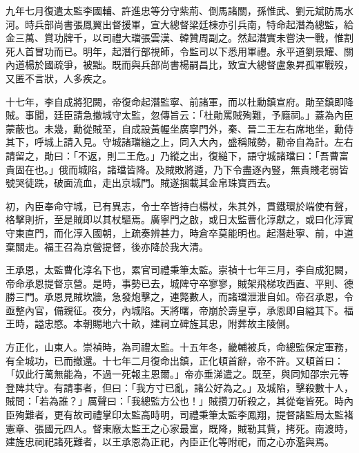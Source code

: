 \begin{pinyinscope}
九年七月復遣太監李國輔、許進忠等分守紫荊、倒馬諸關，孫惟武、劉元斌防馬水河。時兵部尚書張鳳翼出督援軍，宣大總督梁廷棟亦引兵南，特命起潛為總監，給金三萬、賞功牌千，以司禮大璫張雲漢、韓贊周副之。然起潛實未嘗決一戰，惟割死人首冒功而已。明年，起潛行部視師，令監司以下悉用軍禮。永平道劉景耀、關內道楊於國疏爭，被黜。既而與兵部尚書楊嗣昌比，致宣大總督盧象昇孤軍戰歿，又匿不言狀，人多疾之。

十七年，李自成將犯闕，帝復命起潛監寧、前諸軍，而以杜勳鎮宣府。勛至鎮即降賊。事聞，廷臣請急撤城守太監，忽傳旨云：「杜勛罵賊殉難，予廕祠。」蓋為內臣蒙蔽也。未幾，勳從賊至，自成設黃幄坐廣寧門外，秦、晉二王左右席地坐，勳侍其下，呼城上請入見。守城諸璫縋之上，同入大內，盛稱賊勢，勸帝自為計。左右請留之，勛曰：「不返，則二王危。」乃縱之出，復縋下，語守城諸璫曰：「吾曹富貴固在也。」俄而城陷，諸璫皆降。及賊敗將遁，乃下令盡逐內豎，無貴賤老弱皆號哭徒跣，破面流血，走出京城門。賊遂捆載其金帛珠寶西去。

初，內臣奉命守城，已有異志，令士卒皆持白楊杖，朱其外，貫鐵環於端使有聲，格擊則折，至是賊即以其杖驅焉。廣寧門之啟，或日太監曹化淳獻之，或曰化淳實守東直門，而化淳入國朝，上疏奏辨甚力，時倉卒莫能明也。起潛赴寧、前，中道棄關走。福王召為京營提督，後亦降於我大清。

王承恩，太監曹化淳名下也，累官司禮秉筆太監。崇禎十七年三月，李自成犯闕，帝命承恩提督京營。是時，事勢已去，城陴守卒寥寥，賊架飛梯攻西直、平則、德勝三門。承恩見賊坎牆，急發炮擊之，連斃數人，而諸璫泄泄自如。帝召承恩，令亟整內官，備親征。夜分，內城陷。天將曙，帝崩於壽皇亭，承恩即自縊其下。福王時，謚忠愍。本朝賜地六十畝，建祠立碑旌其忠，附葬故主陵側。

方正化，山東人。崇禎時，為司禮太監。十五年冬，畿輔被兵，命總監保定軍務，有全城功，已而撤還。十七年二月復命出鎮，正化頓首辭，帝不許。又頓首曰：「奴此行萬無能為，不過一死報主恩爾。」帝亦垂涕遣之。既至，與同知邵宗元等登陴共守。有請事者，但曰：「我方寸已亂，諸公好為之。」及城陷，擊殺數十人，賊問：「若為誰？」厲聲曰：「我總監方公也！」賊攢刀斫殺之，其從奄皆死。時內臣殉難者，更有故司禮掌印太監高時明，司禮秉筆太監李鳳翔，提督諸監局太監褚憲章、張國元四人。督東廠太監王之心家最富，既降，賊勒其貲，拷死。南渡時，建旌忠祠祀諸死難者，以王承恩為正祀，內臣正化等附祀，而之心亦濫與焉。


\end{pinyinscope}